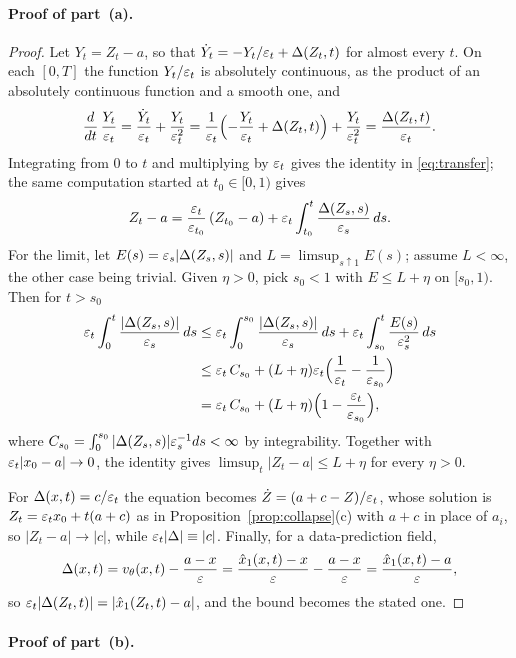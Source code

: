 \documentclass{article} %
\theoremstyle{plain}
\theoremstyle{definition}
\theoremstyle{remark}
\begin{document}
\paragraph{Proof of part~(a).}
\begin{proof}
Let $Y_t=Z_t-a$, so that $\dot Y_t=-Y_t/\varepsilon_t+\Delta(Z_t,t)$ for almost every $t$. On each $[0,T]$
the function $Y_t/\varepsilon_t$ is absolutely continuous, as the product of an absolutely continuous
function and a smooth one, and
\[
\frac{d}{dt}\,\frac{Y_t}{\varepsilon_t}=\frac{\dot Y_t}{\varepsilon_t}+\frac{Y_t}{\varepsilon_t^2}
=\frac{1}{\varepsilon_t}\Bigl(-\frac{Y_t}{\varepsilon_t}+\Delta(Z_t,t)\Bigr)+\frac{Y_t}{\varepsilon_t^2}
=\frac{\Delta(Z_t,t)}{\varepsilon_t}.
\]
Integrating from $0$ to $t$ and multiplying by $\varepsilon_t$ gives the identity in \eqref{eq:transfer}; the
same computation started at $t_0\in[0,1)$ gives
\begin{equation}
Z_t-a=\frac{\varepsilon_t}{\varepsilon_{t_0}}\,(Z_{t_0}-a)+\varepsilon_t\int_{t_0}^t\frac{\Delta(Z_s,s)}{\varepsilon_s}\,ds .
\label{eq:pf:transfer-t0}
\end{equation}
For the limit, let $E(s)=\varepsilon_s|\Delta(Z_s,s)|$ and $L=\limsup_{s\uparrow1}E(s)$; assume
$L<\infty$, the other case being trivial. Given $\eta>0$, pick $s_0<1$ with $E\le L+\eta$ on
$[s_0,1)$. Then for $t>s_0$
\begin{align*}
\varepsilon_t\int_0^t\frac{|\Delta(Z_s,s)|}{\varepsilon_s}\,ds
&\le\varepsilon_t\int_0^{s_0}\frac{|\Delta(Z_s,s)|}{\varepsilon_s}\,ds+\varepsilon_t\int_{s_0}^t\frac{E(s)}{\varepsilon_s^2}\,ds\\
&\le\varepsilon_t\,C_{s_0}+(L+\eta)\varepsilon_t\Bigl(\frac1{\varepsilon_t}-\frac1{\varepsilon_{s_0}}\Bigr)\\
&=\varepsilon_t\,C_{s_0}+(L+\eta)\Bigl(1-\frac{\varepsilon_t}{\varepsilon_{s_0}}\Bigr),
\end{align*}
where $C_{s_0}=\int_0^{s_0}|\Delta(Z_s,s)|\varepsilon_s^{-1}ds<\infty$ by integrability. Together with
$\varepsilon_t|x_0-a|\to0$, the identity gives $\limsup_t|Z_t-a|\le L+\eta$ for every $\eta>0$.

For $\Delta(x,t)=c/\varepsilon_t$ the equation becomes $\dot Z=(a+c-Z)/\varepsilon_t$, whose solution is
$Z_t=\varepsilon_tx_0+t(a+c)$ as in Proposition~\ref{prop:collapse}(c) with $a+c$ in place of $a_i$, so
$|Z_t-a|\to|c|$, while $\varepsilon_t|\Delta|\equiv|c|$. Finally, for a data-prediction field,
\[
\Delta(x,t)=v_\theta(x,t)-\frac{a-x}{\varepsilon}=\frac{\hat x_1(x,t)-x}{\varepsilon}-\frac{a-x}{\varepsilon}
=\frac{\hat x_1(x,t)-a}{\varepsilon},
\]
so $\varepsilon_t|\Delta(Z_t,t)|=|\hat x_1(Z_t,t)-a|$, and the bound becomes the stated one.
\end{proof}
\label{apx:pf-localtransfer}
\paragraph{Proof of part~(b).}
\end{document}
